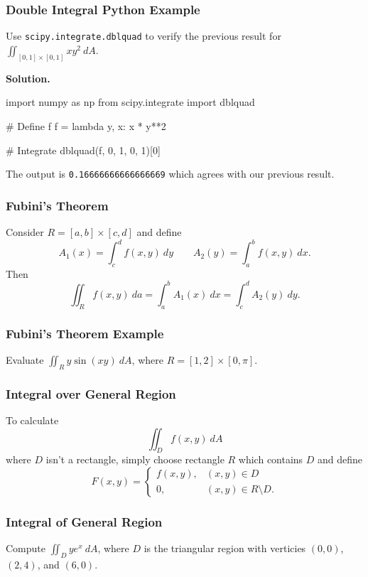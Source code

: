 \documentclass{beamer}
\begin{document}
\begin{frame}[fragile]
\frametitle{Double Integral Python Example}
\small
\begin{Example}
Use \texttt{scipy.integrate.dblquad} to verify the previous result for $\displaystyle\iint_{[0,1]\times[0, 1]} xy^2\ dA$.
\end{Example}
{\bf Solution.}
{
\tiny
\linespread{0.8}
\begin{verbatim*}
import numpy as np
from scipy.integrate import dblquad

# Define f
f = lambda y, x: x * y**2

# Integrate
dblquad(f, 0, 1, 0, 1)[0]
\end{verbatim*}
}
The output is \texttt{0.16666666666666669} which agrees with our previous result. 

\end{frame}

\begin{frame}
\frametitle{Fubini's Theorem}
\begin{Theorem}[Fubini]
Consider $R = [a, b]\times [c, d]$ and define
$$
A_1(x) = \int_c^d f(x, y)\ dy\qquad A_2(y) = \int_a^b f(x, y)\ dx.
$$
Then
$$
\iint_R f(x, y)\ da = \int_a^b A_1(x)\ dx = \int_c^d A_2(y)\ dy.
$$
\end{Theorem}
\end{frame}

\begin{frame}[t]
\frametitle{Fubini's Theorem Example}
\begin{Example}
Evaluate $\displaystyle\iint_R y\sin(xy)\ dA$, where $R = [1, 2]\times [0, \pi]$.
\end{Example}

\end{frame}

\begin{frame}
\frametitle{Integral over General Region}
To calculate
$$
\iint_D f(x, y)\ dA
$$
where $D$ isn't a rectangle, simply choose rectangle $R$ which contains $D$ and define
$$
F(x, y) = \begin{cases} f(x, y),	&	(x, y)\in D\\ 0,	&	(x,y)\in R\setminus D.\end{cases}
$$
\end{frame}

\begin{frame}[t]
\frametitle{Integral of General  Region}
\begin{Example}
Compute $\displaystyle\iint_D ye^x\ dA$, where $D$ is the triangular region with verticies $(0, 0)$, $(2, 4)$, and $(6, 0)$.
\end{Example}

\end{frame}
\end{document}
